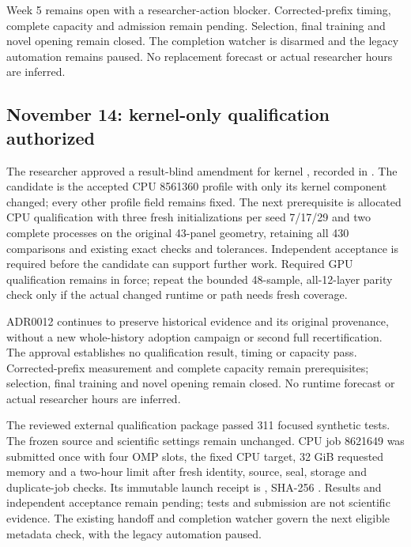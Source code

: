Week 5 remains open with a researcher-action blocker. Corrected-prefix timing,
complete capacity and admission remain pending. Selection, final training and
novel opening remain closed. The completion watcher is disarmed and the legacy
automation remains paused. No replacement forecast or actual researcher hours
are inferred.

\subsection*{November 14: kernel-only qualification authorized}

The researcher approved a result-blind amendment for kernel
, recorded in
. The candidate is the
accepted CPU 8561360 profile with only its kernel component changed; every other
profile field remains fixed. The next prerequisite is allocated CPU qualification
with three fresh initializations per seed 7/17/29 and two complete processes on
the original 43-panel geometry, retaining all 430 comparisons and existing exact
checks and tolerances. Independent acceptance is required before the candidate
can support further work. Required GPU qualification remains in force; repeat
the bounded 48-sample, all-12-layer parity check only if the actual changed
runtime or path needs fresh coverage.

ADR0012 continues to preserve historical evidence and its original provenance,
without a new whole-history adoption campaign or second full recertification.
The approval establishes no qualification result, timing or capacity pass.
Corrected-prefix measurement and complete capacity remain prerequisites;
selection, final training and novel opening remain closed. No runtime forecast
or actual researcher hours are inferred.


The reviewed external qualification package passed 311 focused synthetic tests.
The frozen source and scientific settings remain unchanged. CPU job 8621649 was
submitted once with four OMP slots, the fixed CPU target, 32 GiB requested memory
and a two-hour limit after fresh identity, source, seal, storage and duplicate-job
checks. Its immutable launch receipt is
, SHA-256
.
Results and independent acceptance remain pending; tests and submission are not
scientific evidence. The existing handoff and completion watcher govern the next
eligible metadata check, with the legacy automation paused.


